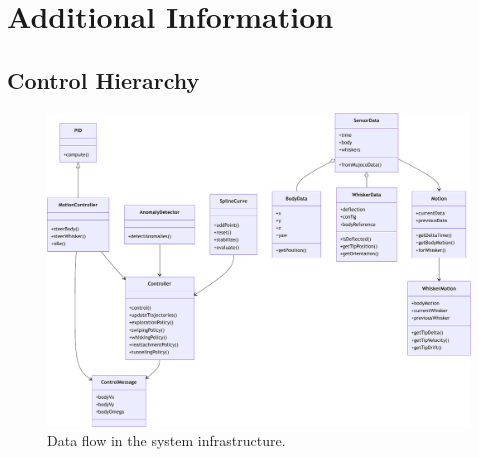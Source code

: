 \chapter{Additional Information}

\section{Control Hierarchy}
\begin{figure}
    \centering
    \includegraphics[width=\textwidth]{figures/diagrams/control-hierarchy}
    \caption{Data flow in the system infrastructure.}
    \label{fig:control-hierarchy}
\end{figure}
